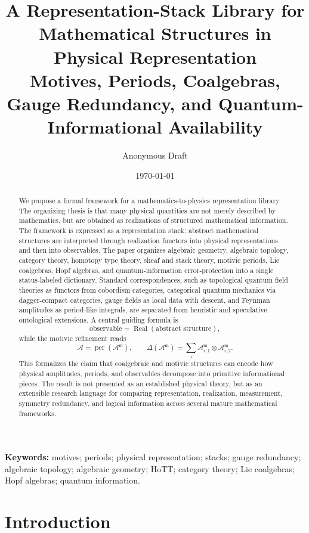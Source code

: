 \documentclass[11pt]{article}
\title{A Representation-Stack Library for Mathematical Structures in Physical Representation\\
\large Motives, Periods, Coalgebras, Gauge Redundancy, and Quantum-Informational Availability}
\author[1]{Anonymous Draft}
\affil[1]{Conceptual mathematics and mathematical physics research note}
\date{\today}
\newcommand{\Real}{\operatorname{Real}}
\newcommand{\per}{\operatorname{per}}
\begin{document}
\maketitle

\begin{abstract}
We propose a formal framework for a mathematics-to-physics representation library. The organizing thesis is that many physical quantities are not merely described by mathematics, but are obtained as realizations of structured mathematical information. The framework is expressed as a representation stack: abstract mathematical structures are interpreted through realization functors into physical representations and then into observables. The paper organizes algebraic geometry, algebraic topology, category theory, homotopy type theory, sheaf and stack theory, motivic periods, Lie coalgebras, Hopf algebras, and quantum-information error-protection into a single status-labeled dictionary. Standard correspondences, such as topological quantum field theories as functors from cobordism categories, categorical quantum mechanics via dagger-compact categories, gauge fields as local data with descent, and Feynman amplitudes as period-like integrals, are separated from heuristic and speculative ontological extensions. A central guiding formula is
\[
\text{observable}=\Real(\text{abstract structure}),
\]
while the motivic refinement reads
\[
\mathcal A = \per(\mathcal A^{\mathfrak m}),\qquad
\Delta(\mathcal A^{\mathfrak m})=\sum_i \mathcal A^{\mathfrak m}_{i,1}\otimes \mathcal A^{\mathfrak m}_{i,2}.
\]
This formalizes the claim that coalgebraic and motivic structures can encode how physical amplitudes, periods, and observables decompose into primitive informational pieces. The result is not presented as an established physical theory, but as an extensible research language for comparing representation, realization, measurement, symmetry redundancy, and logical information across several mature mathematical frameworks.
\end{abstract}

\noindent\textbf{Keywords:} motives; periods; physical representation; stacks; gauge redundancy; algebraic topology; algebraic geometry; HoTT; category theory; Lie coalgebras; Hopf algebras; quantum information.

\tableofcontents

\section{Introduction}
\end{document}
